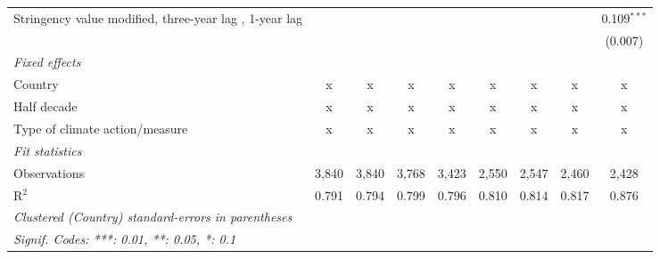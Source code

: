 \begin{table}[htbp]
\begin{tabular}{lcccccccc}
      Stringency value modified, three-year lag , 1-year lag                     &               &               &                &               &               &                &               & 0.109$^{***}$\\   
                                                                                 &               &               &                &               &               &                &               & (0.007)\\   
      \emph{Fixed effects}\\
      Country                                                                    & x             & x             & x              & x             & x             & x              & x             & x\\  
      Half decade                                                                & x             & x             & x              & x             & x             & x              & x             & x\\  
      Type of climate action/measure                                             & x             & x             & x              & x             & x             & x              & x             & x\\  
      \midrule \emph{Fit statistics}\\
      Observations                                                               & 3,840         & 3,840         & 3,768          & 3,423         & 2,550         & 2,547          & 2,460         & 2,428\\  
      R$^2$                                                                      & 0.791         & 0.794         & 0.799          & 0.796         & 0.810         & 0.814          & 0.817         & 0.876\\  
      \midrule
      \multicolumn{9}{l}{\emph{Clustered (Country) standard-errors in parentheses}}\\
      \multicolumn{9}{l}{\emph{Signif. Codes: ***: 0.01, **: 0.05, *: 0.1}}\\
   \end{tabular}
\end{table}


